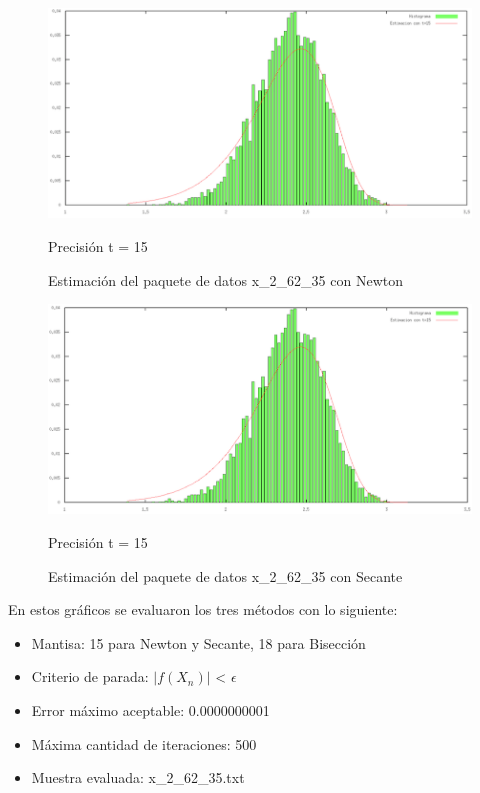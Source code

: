 \documentclass[10pt, a4paper]{article}
\begin{document}
\begin{figure}[H] %
\begin{center}
\includegraphics[width=370pt]{./Newton_15.png}
\caption[h]{Estimaci\'on del paquete de datos x\_2\_62\_35 con Newton}{Precisi\'on t = 15}
\end{center}
\end{figure}

\begin{figure}[H] %
\begin{center}
\includegraphics[width=370pt]{./Secante_15.png}
\caption[h]{Estimaci\'on del paquete de datos x\_2\_62\_35 con Secante}{Precisi\'on t = 15}
\end{center}
\end{figure}

En estos gr\'aficos se evaluaron los tres m\'etodos con lo siguiente:
\begin{itemize}
\item Mantisa: 15 para Newton y Secante, 18 para Bisecci\'on
\item Criterio de parada: $|f(X_{n})|$ < $\epsilon$ 
\item Error m\'aximo aceptable: 0.0000000001
\item M\'axima cantidad de iteraciones: 500
\item Muestra evaluada: x\_2\_62\_35.txt
\end{itemize}
\end{document}
